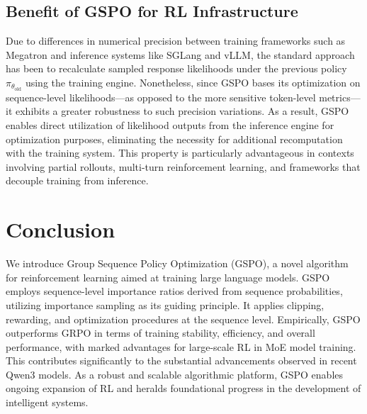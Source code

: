 \subsection{Benefit of GSPO for RL Infrastructure}

Due to differences in numerical precision between training frameworks such as Megatron and inference systems like SGLang and vLLM, the standard approach has been to recalculate sampled response likelihoods under the previous policy $\pi_{\theta_\text{old}}$ using the training engine. Nonetheless, since GSPO bases its optimization on sequence-level likelihoods—as opposed to the more sensitive token-level metrics—it exhibits a greater robustness to such precision variations. As a result, GSPO enables direct utilization of likelihood outputs from the inference engine for optimization purposes, eliminating the necessity for additional recomputation with the training system. This property is particularly advantageous in contexts involving partial rollouts, multi-turn reinforcement learning, and frameworks that decouple training from inference.

\section{Conclusion}

We introduce Group Sequence Policy Optimization (GSPO), a novel algorithm for reinforcement learning aimed at training large language models. GSPO employs sequence-level importance ratios derived from sequence probabilities, utilizing importance sampling as its guiding principle. It applies clipping, rewarding, and optimization procedures at the sequence level. Empirically, GSPO outperforms GRPO in terms of training stability, efficiency, and overall performance, with marked advantages for large-scale RL in MoE model training. This contributes significantly to the substantial advancements observed in recent Qwen3 models. As a robust and scalable algorithmic platform, GSPO enables ongoing expansion of RL and heralds foundational progress in the development of intelligent systems.


